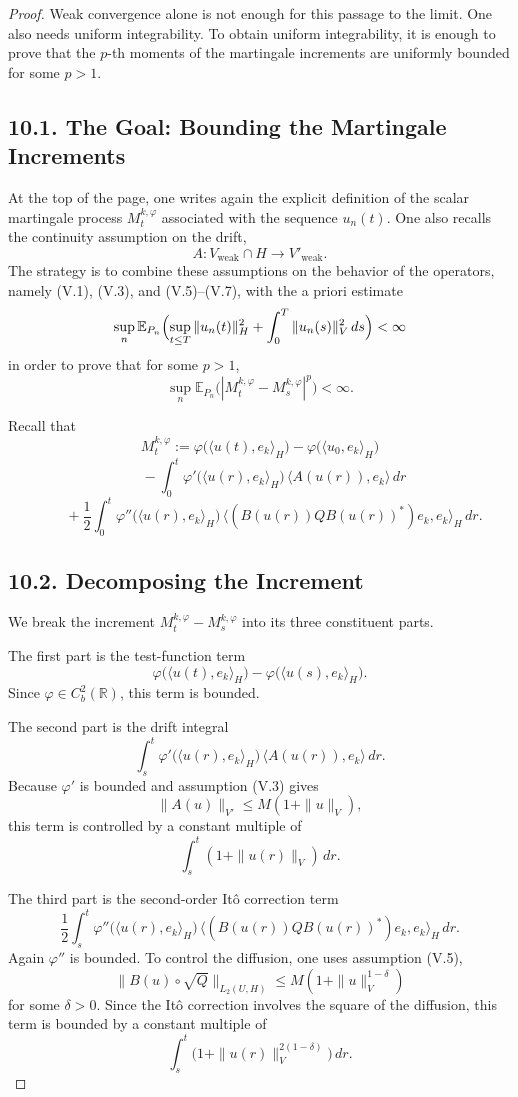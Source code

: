 \documentclass[11pt]{article}
\theoremstyle{definition}
\theoremstyle{remark}
\begin{document}
\begin{proof}
Weak convergence alone is not enough for this passage to the limit. One also needs uniform integrability. To obtain uniform integrability, it is enough to prove that the $p$-th moments of the martingale increments are uniformly bounded for some $p>1$.

\subsection*{10.1. The Goal: Bounding the Martingale Increments}
At the top of the page, one writes again the explicit definition of the scalar martingale process $M_t^{k,\varphi}$ associated with the sequence $u_n(t)$. One also recalls the continuity assumption on the drift,
\[
  A:V_{\mathrm{weak}}\cap H\to V'_{\mathrm{weak}}.
\]
The strategy is to combine these assumptions on the behavior of the operators, namely (V.1), (V.3), and (V.5)--(V.7), with the a priori estimate
\[
  \sup_n \mathbb E_{P_n}\Bigl(\sup_{t\le T}\|u_n(t)\|_H^2+\int_0^T \|u_n(s)\|_V^2\,ds\Bigr)<\infty
\]
in order to prove that for some $p>1$,
\[
  \sup_n \mathbb E_{P_n}\bigl(|M_t^{k,\varphi}-M_s^{k,\varphi}|^p\bigr)<\infty.
\]

Recall that
\[
  M_t^{k,\varphi}
  :=\varphi\bigl(\langle u(t),e_k\rangle_H\bigr)-\varphi\bigl(\langle u_0,e_k\rangle_H\bigr)
\]
\[
  \qquad -\int_0^t \varphi'\bigl(\langle u(r),e_k\rangle_H\bigr)\,\langle A(u(r)),e_k\rangle\,dr
\]
\[
  \qquad +\frac12\int_0^t \varphi''\bigl(\langle u(r),e_k\rangle_H\bigr)\,
  \bigl\langle (B(u(r))Q B(u(r))^*)e_k,e_k\bigr\rangle_H\,dr.
\]

\subsection*{10.2. Decomposing the Increment}
We break the increment $M_t^{k,\varphi}-M_s^{k,\varphi}$ into its three constituent parts.

The first part is the test-function term
\[
  \varphi\bigl(\langle u(t),e_k\rangle_H\bigr)-\varphi\bigl(\langle u(s),e_k\rangle_H\bigr).
\]
Since $\varphi\in C_b^2(\mathbb R)$, this term is bounded.

The second part is the drift integral
\[
  \int_s^t \varphi'\bigl(\langle u(r),e_k\rangle_H\bigr)\,\langle A(u(r)),e_k\rangle\,dr.
\]
Because $\varphi'$ is bounded and assumption (V.3) gives
\[
  \|A(u)\|_{V'}\le M(1+\|u\|_V),
\]
this term is controlled by a constant multiple of
\[
  \int_s^t (1+\|u(r)\|_V)\,dr.
\]

The third part is the second-order It\^o correction term
\[
  \frac12\int_s^t \varphi''\bigl(\langle u(r),e_k\rangle_H\bigr)\,
  \bigl\langle (B(u(r))Q B(u(r))^*)e_k,e_k\bigr\rangle_H\,dr.
\]
Again $\varphi''$ is bounded. To control the diffusion, one uses assumption (V.5),
\[
  \|B(u)\circ \sqrt Q\|_{L_2(U,H)}\le M(1+\|u\|_V^{1-\delta})
\]
for some $\delta>0$. Since the It\^o correction involves the square of the diffusion, this term is bounded by a constant multiple of
\[
  \int_s^t \bigl(1+\|u(r)\|_V^{2(1-\delta)}\bigr)\,dr.
\]


\end{proof}
\end{document}
